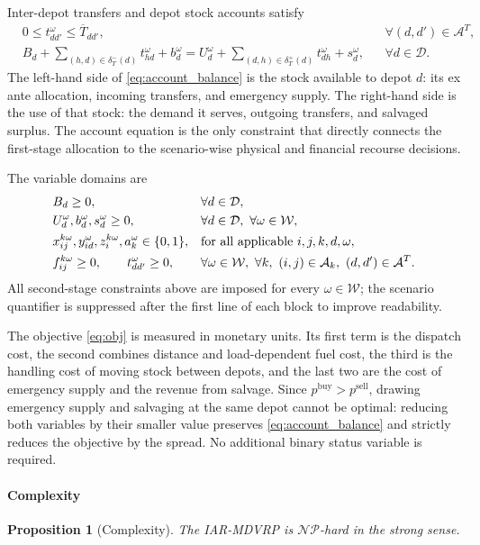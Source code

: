 \documentclass[authoryear,final,3p,times]{elsarticle}
\newtheorem{proposition}{Proposition}
\theoremstyle{definition}
\theoremstyle{plain}
\begin{document}
Inter-depot transfers and depot stock accounts satisfy
\begin{align}
&0\le t_{dd'}^\omega\le\overline T_{dd'},
&&\forall(d,d')\in\mathcal A^T,
\label{eq:transfer_capacity}\\
&B_d
+\sum_{(h,d)\in\delta_T^-(d)}t_{hd}^\omega
+b_d^\omega
=U_d^\omega
+\sum_{(d,h)\in\delta_T^+(d)}t_{dh}^\omega
+s_d^\omega,
&&\forall d\in\mathcal D.
\label{eq:account_balance}
\end{align}
The left-hand side of \eqref{eq:account_balance} is the stock available to
depot $d$: its ex ante allocation, incoming transfers, and emergency supply.
The right-hand side is the use of that stock: the demand it serves, outgoing
transfers, and salvaged surplus.  The account equation is the only constraint
that directly connects the first-stage allocation to the scenario-wise
physical and financial recourse decisions.

The variable domains are
\begin{align}
&B_d\ge0,
&&\forall d\in\mathcal D,
\notag\\
&U_d^\omega,b_d^\omega,s_d^\omega\ge0,
&&\forall d\in\mathcal D,\ \forall\omega\in\mathcal W,
\notag\\
&x_{ij}^{k\omega},y_{id}^\omega,z_i^{k\omega},a_k^\omega\in\{0,1\},
&&\text{for all applicable }i,j,k,d,\omega,
\notag\\
&f_{ij}^{k\omega}\ge0,
\qquad
t_{dd'}^\omega\ge0,
&&\forall\omega\in\mathcal W,\ \forall k,\ (i,j)\in\mathcal A_k,\ (d,d')\in\mathcal A^T.
\label{eq:c_domain}
\end{align}
All second-stage constraints above are imposed for every
$\omega\in\mathcal W$; the scenario quantifier is suppressed after the first
line of each block to improve readability.

The objective \eqref{eq:obj} is measured in monetary units.  Its first term is
the dispatch cost, the second combines distance and load-dependent fuel cost,
the third is the handling cost of moving stock between depots, and the last two
are the cost of emergency supply and the revenue from salvage.  Since
$p^{\mathrm{buy}}>p^{\mathrm{sell}}$, drawing emergency supply and salvaging at
the same depot cannot be optimal: reducing both variables by their smaller
value preserves \eqref{eq:account_balance} and strictly reduces the objective
by the spread.  No additional binary status variable is required.

\paragraph{Complexity}
\begin{proposition}[Complexity]
\label{prop:complexity}
The IAR-MDVRP is $\mathcal{NP}$-hard in the strong sense.
\end{proposition}
\end{document}
